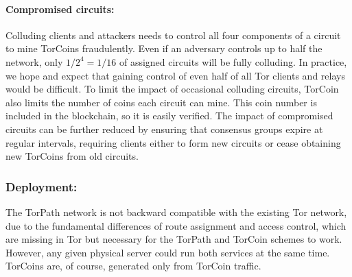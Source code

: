 \paragraph{Compromised circuits:} Colluding clients and
attackers needs to control all four components of a circuit to mine TorCoins
fraudulently. Even if an adversary controls up to half the network,
only $1/2^4 = 1/16$ of assigned circuits will be fully colluding.
In practice, we hope and expect that 
gaining control of even half of all Tor clients and relays would be difficult.
To limit the impact of occasional colluding circuits,
TorCoin also limits the number
of coins each circuit can mine. This coin number is
included in the blockchain, so it is easily verified. 
The impact of
compromised circuits can be further reduced by ensuring that consensus groups
expire at regular intervals, requiring clients either to form new circuits
or cease obtaining new TorCoins from old circuits.

\subsubsection{Deployment:} The TorPath network is not backward compatible with
the existing Tor network, due to the fundamental differences of route
assignment and access control, which are missing in Tor but necessary for
the TorPath and TorCoin schemes to work.
However, any given physical server could run both services at the same
time. TorCoins are, of course, generated only from TorCoin traffic.
